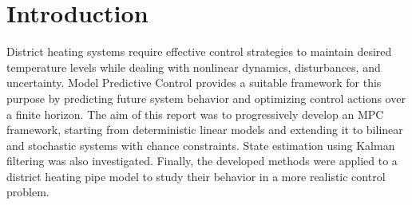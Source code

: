 \chapter{Introduction}

District heating systems require effective control strategies to maintain desired temperature levels while dealing with nonlinear dynamics, disturbances, and uncertainty. Model Predictive Control provides a suitable framework for this purpose by predicting future system behavior and optimizing control actions over a finite horizon. The aim of this report was to progressively develop an MPC framework, starting from deterministic linear models and extending it to bilinear and stochastic systems with chance constraints. State estimation using Kalman filtering was also investigated. Finally, the developed methods were applied to a district heating pipe model to study their behavior in a more realistic control problem.